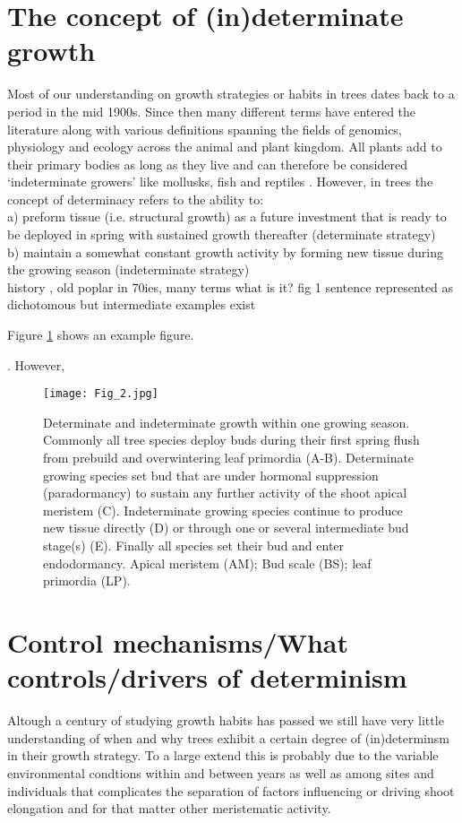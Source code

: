 \documentclass{article}
\begin{document}
	
\section*{The concept of (in)determinate growth}
Most of our understanding on growth strategies or habits in trees dates back to a period in the mid 1900s. Since then many different terms have entered the literature along with various definitions spanning the fields of genomics, physiology and ecology across the animal and plant kingdom. All plants add to their primary bodies as long as they live and can therefore be considered ‘indeterminate growers’ like mollusks, fish and reptiles \citep{ejsmondHowTimeGrowth2010}. However, in trees the concept of determinacy refers to the ability to:\\
a) preform tissue (i.e. structural growth) as a future investment that is ready to be deployed in spring with sustained growth thereafter (determinate strategy)\\
b) maintain a somewhat constant growth activity by forming new tissue during the growing season (indeterminate strategy)\\




	history , old poplar in 70ies, many terms
	what is it? fig
	1 sentence represented as dichotomous but intermediate examples exist
	
		Figure \ref{fig:fig_2xxx} shows an example figure.
	
	. However, 
	
	
								\begin{figure}
								\centering
								\texttt{[image: Fig\_2.jpg]} 
								\caption{Determinate and indeterminate growth within one growing season. Commonly all tree species deploy buds during their first spring flush from prebuild and overwintering leaf primordia (A-B). Determinate growing species set bud that are under hormonal suppression (paradormancy) to sustain any further activity of the shoot apical meristem (C). Indeterminate growing species continue to produce new tissue directly (D) or through one or several intermediate bud stage(s) (E). Finally all species set their bud and enter endodormancy. Apical meristem (AM); Bud scale (BS); leaf primordia (LP).}
								\label{fig:fig_2xxx}
								\end{figure}
	
\section*{Control mechanisms/What controls/drivers of determinism}
Altough a century of studying growth habits has passed we still have very little understanding of when and why trees exhibit a certain degree of (in)determinsm in their growth strategy. To a large extend this is probably due to the variable environmental condtions within and between years as well as among sites and individuals that complicates the separation of factors influencing or driving shoot elongation and for that matter other meristematic activity.
\end{document}
